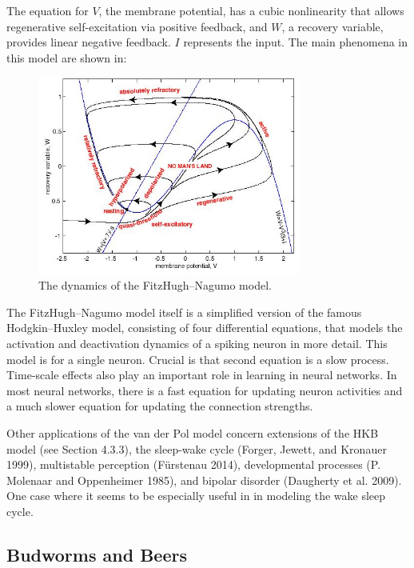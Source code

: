 \documentclass[
  letterpaper,
]{scrbook}
\begin{document}
The equation for \(V\), the membrane potential, has a cubic nonlinearity
that allows regenerative self-excitation via positive feedback, and
\(W\), a recovery variable, provides linear negative feedback. \(I\)
represents the input. The main phenomena in this model are shown in:

\begin{figure}

{\centering \includegraphics[width=3.41806in,height=\textheight]{media/ch5/image15.jpg}

}

\caption{\label{fig-ch5-img15-old-63}The dynamics of the
FitzHugh--Nagumo model.}

\end{figure}

The FitzHugh--Nagumo model itself is a simplified version of the famous
Hodgkin--Huxley model, consisting of four differential equations, that
models the activation and deactivation dynamics of a spiking neuron in
more detail. This model is for a single neuron. Crucial is that second
equation is a slow process. Time-scale effects also play an important
role in learning in neural networks. In most neural networks, there is a
fast equation for updating neuron activities and a much slower equation
for updating the connection strengths.

Other applications of the van der Pol model concern extensions of the
HKB model (see Section 4.3.3), the sleep-wake cycle (Forger, Jewett, and
Kronauer 1999), multistable perception (Fürstenau 2014), developmental
processes (P. Molenaar and Oppenheimer 1985), and bipolar disorder
(Daugherty et al. 2009). One case where it seems to be especially useful
in in modeling the wake sleep cycle.

\hypertarget{budworms-and-beers}{%
\subsection{Budworms and Beers}\label{budworms-and-beers}}
\end{document}
